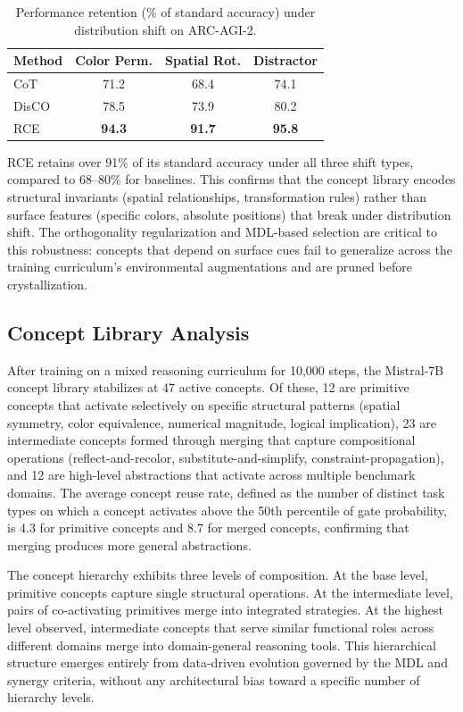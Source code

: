 \documentclass[11pt]{article}
\begin{document}
\begin{table}[t]
\centering
\caption{Performance retention (\% of standard accuracy) under distribution shift on ARC-AGI-2.}
\label{tab:ood}
\small
\begin{tabular}{lccc}
\toprule
Method & Color Perm. & Spatial Rot. & Distractor \\
\midrule
CoT & 71.2 & 68.4 & 74.1 \\
DisCO & 78.5 & 73.9 & 80.2 \\
RCE & \textbf{94.3} & \textbf{91.7} & \textbf{95.8} \\
\bottomrule
\end{tabular}
\end{table}

RCE retains over 91\% of its standard accuracy under all three shift types, compared to 68--80\% for baselines. This confirms that the concept library encodes structural invariants (spatial relationships, transformation rules) rather than surface features (specific colors, absolute positions) that break under distribution shift. The orthogonality regularization and MDL-based selection are critical to this robustness: concepts that depend on surface cues fail to generalize across the training curriculum's environmental augmentations and are pruned before crystallization.

\subsection{Concept Library Analysis}

After training on a mixed reasoning curriculum for 10,000 steps, the Mistral-7B concept library stabilizes at 47 active concepts. Of these, 12 are primitive concepts that activate selectively on specific structural patterns (spatial symmetry, color equivalence, numerical magnitude, logical implication), 23 are intermediate concepts formed through merging that capture compositional operations (reflect-and-recolor, substitute-and-simplify, constraint-propagation), and 12 are high-level abstractions that activate across multiple benchmark domains. The average concept reuse rate, defined as the number of distinct task types on which a concept activates above the 50th percentile of gate probability, is 4.3 for primitive concepts and 8.7 for merged concepts, confirming that merging produces more general abstractions.

The concept hierarchy exhibits three levels of composition. At the base level, primitive concepts capture single structural operations. At the intermediate level, pairs of co-activating primitives merge into integrated strategies. At the highest level observed, intermediate concepts that serve similar functional roles across different domains merge into domain-general reasoning tools. This hierarchical structure emerges entirely from data-driven evolution governed by the MDL and synergy criteria, without any architectural bias toward a specific number of hierarchy levels.
\end{document}
